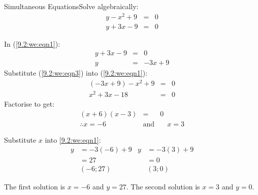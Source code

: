 \begin{wex}{Simultaneous Equations}{Solve algebraically:
\begin{eqnarray}
 y - x^2 + 9 &=& 0 \label{9.2:we:eqn1}\\
 y + 3x - 9 &=& 0 \label{9.2:we:eqn2}
\end{eqnarray}}
{
In (\ref{9.2:we:eqn1}):
\begin{eqnarray}
 y + 3x - 9 &=& 0 \nonumber\\
 y &=& -3x +9 \label{9.2:we:eqn3}
\end{eqnarray}
Substitute (\ref{9.2:we:eqn3}) into (\ref{9.2:we:eqn1}):
\begin{eqnarray*}
 (-3x + 9) - x^2 + 9 &=& 0\\
 x^2 + 3x - 18 &=& 0
\end{eqnarray*}
Factorise to get:
\begin{eqnarray*}
 (x + 6)(x - 3) &=& 0\\
\therefore x = -6 \quad &\mbox{and}& \quad x = 3
\end{eqnarray*}

Substitute $x$ into \ref{9.2:we:eqn1}:
\begin{align*}
 y &= -3(-6) + 9	&	y &= -3(3) + 9\\
   &= 27		&	  &= 0\\
   &(-6;27)		&	  &(3;0)
\end{align*}

The first solution is $x=-6$ and $y=27$. The second solution is $x=3$ and $y=0$.}
\end{wex}

